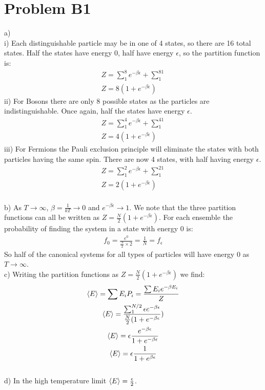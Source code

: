\documentclass[a4paper,11pt]{article}
\numberwithin{equation}{section}
\begin{document}
\section{Problem B1}
a) \\
i) Each distinguishable particle may be in one of 4 states, so there are 16 total states. 
Half the states have energy 0, half have energy $\epsilon$, so the partition function is:
\begin{gather}
 Z=\sum_1^8e^{-\beta\epsilon}+\sum_1^81\\
 Z=8(1+e^{-\beta\epsilon})
\end{gather}
ii) For Bosons there are only 8 possible states as the particles are indistinguishable. Once again, half the states have energy $\epsilon$.
\begin{gather}
 Z=\sum_1^4e^{-\beta\epsilon}+\sum_1^41\\
 Z=4(1+e^{-\beta\epsilon})
\end{gather}
iii) For Fermions the Pauli exclusion principle will eliminate the states with both particles having the same spin.
There are now 4 states, with half having energy $\epsilon$.
\begin{gather}
 Z=\sum_1^2e^{-\beta\epsilon}+\sum_1^21\\
 Z=2(1+e^{-\beta\epsilon})
\end{gather}
\\
b) As $T \rightarrow \infty$, $\beta=\frac{1}{kT}\rightarrow 0$ and $e^{-\beta\epsilon}\rightarrow 1$.
We note that the three partition functions can all be written as $Z=\frac{N}{2}(1+e^{-\beta \epsilon})$.
For each ensemble the probability of finding the system in a state with energy 0 is:
\begin{gather}
 f_0=\frac{e^{0}}{\frac{N}{2}\times 2}=\frac{1}{N}=f_\epsilon
\end{gather}
So half of the canonical systems for all types of particles will have energy 0 as $T\rightarrow \infty$.
\\
c) Writing the partition functions as $Z=\frac{N}{2}(1+e^{-\beta \epsilon})$ we find:
\begin{gather}
 \braket{E}=\sum E_i P_i=\frac{\sum E_i e^{-\beta E_i}}{Z}\\
 \braket{E}=\frac{\sum_1^{N/2}\epsilon e^{-\beta\epsilon}}{\frac{N}{2}(1+e^{-\beta \epsilon}})\\
 \braket{E}=\epsilon\frac{e^{-\beta\epsilon}}{1+e^{-\beta\epsilon}}\\
 \braket{E}=\epsilon\frac{1}{1+e^{\beta \epsilon}}
\end{gather}
\\
d) In the high temperature limit $\braket{E}=\frac{\epsilon}{2}$.
\end{document}
